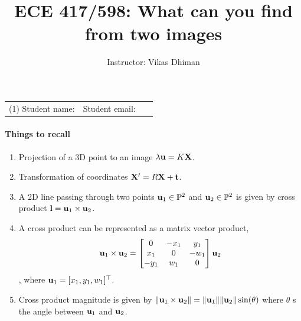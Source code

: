 \documentclass[times,singlecolumn]{article}
\title{ECE 417/598: What can you find from two images}
\author{Instructor: Vikas Dhiman}
\begin{document}
\maketitle
\begin{tabular}{p{0.5\linewidth}p{0.5\linewidth}}
  (1) Student name:& Student email: \\
\end{tabular}

\paragraph{Things to recall}
\begin{enumerate}
  \item Projection of a 3D point to an image $\lambda \mathbf{u} = K \mathbf{X}$.
  \item Transformation of coordinates $\mathbf{X}' = R \mathbf{X} + \mathbf{t}$.
  \item A 2D line passing through two points $\mathbf{u}_1 \in \mathbb{P}^2$ and $\mathbf{u}_2 \in
    \mathbb{P}^2$ is given by cross product $\mathbf{l} = \mathbf{u}_1 \times \mathbf{u}_2$.
  \item A cross product can be represented as a matrix vector product,
    \[
      \mathbf{u}_1 \times \mathbf{u}_2 = \begin{bmatrix}
                               0 & -x_1 & y_1\\
                               x_1 & 0  & -w_1\\
                               -y_1 & w_1  & 0
                               \end{bmatrix} \mathbf{u}_2
      \], where $\mathbf{u}_1 = [x_1, y_1, w_1]^\top$.
   \item Cross product magnitude is given by $ \| \mathbf{u}_1 \times \mathbf{u}_2 \| =
     \|\mathbf{u}_1 \| \|\mathbf{u}_2 \| \sin(\theta)$ where $\theta$ s the angle between
     $\mathbf{u}_1$ and $\mathbf{u}_2$.
\end{enumerate}
\end{document}
